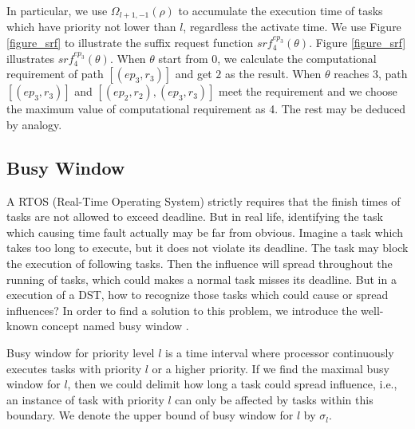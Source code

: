 \documentclass[conference]{IEEEtran}
\begin{document}
In particular, we use $\Omega_{l+1,-1}(\rho)$ to accumulate the execution time of tasks which have priority not lower than $l$, regardless the activate time. We use Figure \ref{figure_srf} to illustrate the suffix request function $srf^{ep_3}_{4}(\theta)$. Figure \ref{figure_srf} illustrates $srf^{ep_3}_{4}(\theta)$. When $\theta$ start from 0, we calculate the computational requirement of path $[(ep_3,r_3)]$ and get $2$ as the result. When $\theta$ reaches 3, path $[(ep_3,r_3)]$ and $[(ep_2,r_2),(ep_3,r_3)]$ meet the requirement and we choose the maximum value of computational requirement as 4. The rest may be deduced by analogy.


\subsection{Busy Window}\label{section_busywindow}

A RTOS (Real-Time Operating System) strictly requires that the finish times of tasks are not allowed to exceed deadline. But in real life, identifying the task which causing time fault actually may be far from obvious. Imagine a task which takes too long to execute, but it does not violate its deadline. The task may block the execution of following tasks. Then the influence will spread throughout the running of tasks, which could makes a normal task misses its deadline. But in a execution of a DST, how to recognize those tasks which could cause or spread influences? 
In order to find a solution to this problem, we introduce the well-known concept named busy window \cite{DBLP:conf/rtss/Lehoczky90}. 

Busy window for priority level $l$ is a time interval where processor continuously executes tasks with priority $l$ or a higher priority. If we find the maximal busy window for $l$, then we could delimit how long a task could spread influence, i.e., an instance of task with priority $l$ can only be affected by tasks within this boundary. We denote the upper bound of busy window for $l$ by $\sigma_l$.
\end{document}
